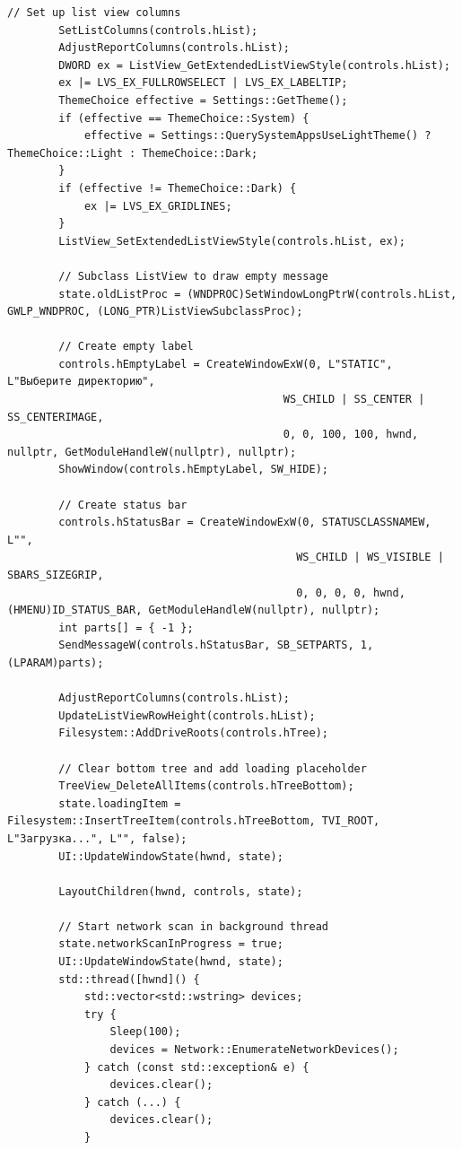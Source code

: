 \begin{lstlisting}[style=CodeListing]
        // Set up list view columns
        SetListColumns(controls.hList);
        AdjustReportColumns(controls.hList);
        DWORD ex = ListView_GetExtendedListViewStyle(controls.hList);
        ex |= LVS_EX_FULLROWSELECT | LVS_EX_LABELTIP;
        ThemeChoice effective = Settings::GetTheme();
        if (effective == ThemeChoice::System) {
            effective = Settings::QuerySystemAppsUseLightTheme() ? ThemeChoice::Light : ThemeChoice::Dark;
        }
        if (effective != ThemeChoice::Dark) {
            ex |= LVS_EX_GRIDLINES;
        }
        ListView_SetExtendedListViewStyle(controls.hList, ex);
        
        // Subclass ListView to draw empty message
        state.oldListProc = (WNDPROC)SetWindowLongPtrW(controls.hList, GWLP_WNDPROC, (LONG_PTR)ListViewSubclassProc);
        
        // Create empty label
        controls.hEmptyLabel = CreateWindowExW(0, L"STATIC", L"Выберите директорию",
                                           WS_CHILD | SS_CENTER | SS_CENTERIMAGE,
                                           0, 0, 100, 100, hwnd, nullptr, GetModuleHandleW(nullptr), nullptr);
        ShowWindow(controls.hEmptyLabel, SW_HIDE);
        
        // Create status bar
        controls.hStatusBar = CreateWindowExW(0, STATUSCLASSNAMEW, L"",
                                             WS_CHILD | WS_VISIBLE | SBARS_SIZEGRIP,
                                             0, 0, 0, 0, hwnd, (HMENU)ID_STATUS_BAR, GetModuleHandleW(nullptr), nullptr);
        int parts[] = { -1 };
        SendMessageW(controls.hStatusBar, SB_SETPARTS, 1, (LPARAM)parts);
        
        AdjustReportColumns(controls.hList);
        UpdateListViewRowHeight(controls.hList);
        Filesystem::AddDriveRoots(controls.hTree);
        
        // Clear bottom tree and add loading placeholder
        TreeView_DeleteAllItems(controls.hTreeBottom);
        state.loadingItem = Filesystem::InsertTreeItem(controls.hTreeBottom, TVI_ROOT, L"Загрузка...", L"", false);
        UI::UpdateWindowState(hwnd, state);
        
        LayoutChildren(hwnd, controls, state);
        
        // Start network scan in background thread
        state.networkScanInProgress = true;
        UI::UpdateWindowState(hwnd, state);
        std::thread([hwnd]() {
            std::vector<std::wstring> devices;
            try {
                Sleep(100);
                devices = Network::EnumerateNetworkDevices();
            } catch (const std::exception& e) {
                devices.clear();
            } catch (...) {
                devices.clear();
            }
            

\end{lstlisting}
